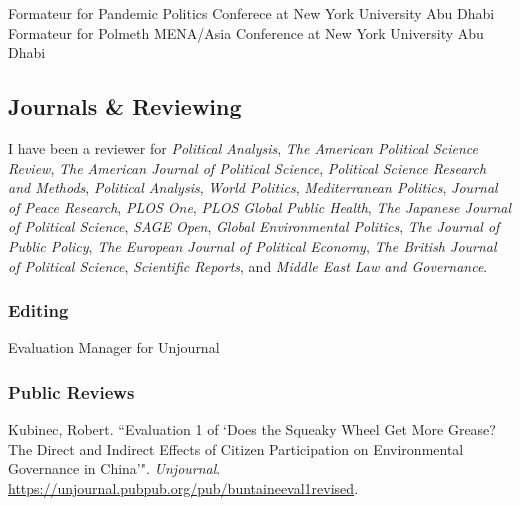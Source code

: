 \documentclass[11pt, a4paper]{article}
\newcommand{\years}[1]{\marginnote{\scriptsize #1}}
\begin{document}
\years{2023}Formateur for Pandemic Politics Conferece at New York University Abu Dhabi\\
\years{2024}Formateur for Polmeth MENA/Asia Conference at New York University Abu Dhabi 

\subsection*{Journals \& Reviewing}

I have been a reviewer for \emph{Political Analysis}, \emph{The American Political Science Review}, \emph{The American Journal of Political Science}, \emph{Political Science Research and Methods}, \emph{Political Analysis}, \emph{World Politics}, \emph{Mediterranean Politics}, \emph{Journal of Peace Research}, \emph{PLOS One}, \emph{PLOS Global Public Health}, \emph{The Japanese Journal of Political Science}, \emph{SAGE Open}, \emph{Global Environmental Politics}, \emph{The Journal of Public Policy}, \emph{The European Journal of Political Economy}, \emph{The British Journal of Political Science}, \emph{Scientific Reports}, and \emph{Middle East Law and Governance}.\\

\subsubsection*{Editing}

\years{2023-2024} Evaluation Manager for Unjournal

\subsubsection*{Public Reviews}

\years{2023}Kubinec, Robert. ``Evaluation 1 of `Does the Squeaky Wheel Get More Grease? The Direct and Indirect Effects of Citizen Participation on Environmental Governance in China'". \emph{Unjournal}. \url{https://unjournal.pubpub.org/pub/buntaineeval1revised}.

%
\end{document}
